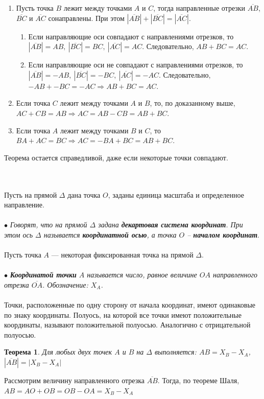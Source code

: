 \begin{Proof}
	\begin{enumerate}
		\item Пусть точка $B$ лежит между точками $A$ и $C$, тогда направленные отрезки $\overline{AB}$, $\overline{BC}$ и $\overline{AC}$ сонаправлены. При этом $|\overline{AB}| + |\overline{BC}| = |\overline{AC}|$.
		\begin{enumerate}
			\item Если направляющие оси совпадают с направлениями отрезков, то $|\overline{AB}| = AB,\ |\overline{BC}| = BC,\  |\overline{AC}| = AC$. Следовательно, $AB + BC = AC$.
			\item Если направляющие оси не совпадают с направлениями отрезков, то $|\overline{AB}| = -AB,\ |\overline{BC}| = -BC,\  |\overline{AC}| = -AC$. Следовательно, $-AB + -BC = -AC\Rightarrow AB + BC = AC$.
		\end{enumerate}
		\item Если точка $C$ лежит между точками $A$ и $B$, то, по доказанному выше, $AC + CB = AB\Rightarrow AC = AB - CB = AB + BC$.
		\item Если точка $A$ лежит между точками $B$ и $C$, то $BA + AC = BC\Rightarrow AC = - BA + BC = AB + BC$.
	\end{enumerate}
	Теорема остается справедливой, даже если некоторые точки совпадают.
\end{Proof}\\\\
Пусть на прямой $\Delta$ дана точка $O$, заданы единица масштаба и определенное направление.\\\\
$\bullet$ \textit{Говорят, что на
	прямой $\Delta$ задана \textbf{декартовая система координат}. При этом ось $\Delta$ называется
	\textbf{координатной осью}, а точка $O$ – \textbf{началом координат}}.\\\\
Пусть точка $A$ --- некоторая фиксированная точка на прямой $\Delta$.\\\\
$\bullet$ \textit{\textbf{Координатой точки} $A$ называется число, равное
	величине $OA$ направленного отрезка $\overline{OA}$. Обозначение: $X_A$.} \\\\
Точки, расположенные по одну сторону от начала координат, имеют одинаковые по знаку координаты. Полуось, на которой все точки имеют положительные координаты, называют
положительной полуосью. Аналогично с отрицательной полуосью.
\newtheorem*{t1_2}{Теорема}\begin{t1_2} Для любых двух точек $A$ и $B$ на $\Delta$ выполняется: $AB = X_B - X_A$, $|\overline{AB}| = |X_B - X_A|$
\end{t1_2}\begin{Proof}
	Рассмотрим величину направленного отрезка $\overline{AB}$. Тогда, по теореме Шаля, $AB = AO + OB = OB-OA = X_B-X_A$
\end{Proof}\\\\
